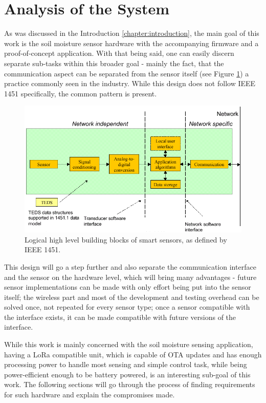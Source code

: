 
\section{Analysis of the System}
As was discussed in the Introduction \ref{chapter:introduction}, the main goal of this work is the soil moisture sensor hardware with the accompanying firmware and a proof-of-concept application. With that being said, one can easily discern separate sub-tasks within this broader goal - mainly the fact, that the communication aspect can be separated from the sensor itself (see Figure \ref{fig:device-split}) a practice commonly seen in the industry. While this design does not follow IEEE 1451 \cite{mark_ieee_nodate} specifically, the common pattern is present.

\begin{figure}
    \includegraphics[width=\textwidth]{fig/ieee-1451.png}
    \caption{\label{fig:device-split}Logical high level building blocks of smart sensors, as defined by IEEE 1451.}
\end{figure}

This design will go a step further and also separate the communication interface and the sensor on the hardware level, which will bring many advantages - future sensor implementations can be made with only effort being put into the sensor itself; the wireless part and most of the development and testing overhead can be solved once, not repeated for every sensor type; once a sensor compatible with the interface exists, it can be made compatible with future versions of the interface.

While this work is mainly concerned with the soil moisture sensing application, having a LoRa compatible unit, which is capable of OTA updates and has enough processing power to handle most sensing and simple control task, while being power-efficient enough to be battery powered, is an interesting sub-goal of this work. The following sections will go through the process of finding requirements for such hardware and explain the compromises made.

